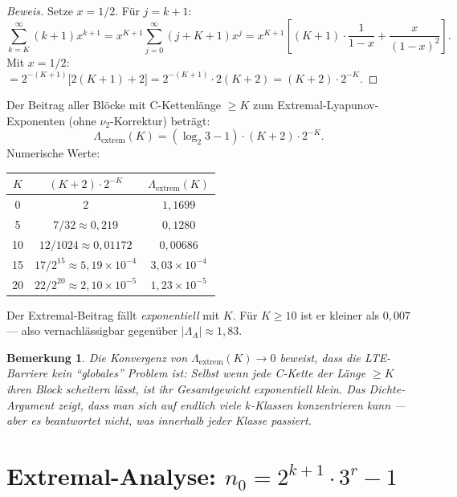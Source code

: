 \documentclass[12pt,a4paper]{article}
\newtheorem{bemerkung}[definition]{Bemerkung}
\newenvironment{beweis}{\begin{proof}[Beweis]}{\end{proof}}
\newcommand{\vii}{\nu_2}
\begin{document}
\begin{beweis}
Setze $x = 1/2$. Für $j = k+1$:
\[
  \sum_{k=K}^{\infty}(k+1)x^{k+1}
  = x^{K+1}\sum_{j=0}^{\infty}(j+K+1)x^j
  = x^{K+1}\!\left[(K+1)\cdot\frac{1}{1-x} + \frac{x}{(1-x)^2}\right].
\]
Mit $x=1/2$: $= 2^{-(K+1)}\bigl[2(K+1)+2\bigr] = 2^{-(K+1)}\cdot 2(K+2) = (K+2)\cdot 2^{-K}$.
\end{beweis}

\begin{tcolorbox}[ergebnis, title={Extremal-Beitrag ist vernachlässigbar}]
Der Beitrag aller Blöcke mit C-Kettenlänge $\geq K$ zum
Extremal-Lyapunov-Exponenten (ohne $\vii$-Korrektur) beträgt:
\[
  \Lambda_{\mathrm{extrem}}(K) =
  (\log_2 3 - 1)\cdot(K+2)\cdot 2^{-K}.
\]
Numerische Werte:
\begin{center}
\renewcommand{\arraystretch}{1.25}
\begin{tabular}{ccc}
\toprule
$K$ & $(K+2)\cdot 2^{-K}$ & $\Lambda_{\mathrm{extrem}}(K)$ \\
\midrule
0  & $2$         & $1{,}1699$ \\
5  & $7/32 \approx 0{,}219$ & $0{,}1280$ \\
10 & $12/1024 \approx 0{,}01172$ & $0{,}00686$ \\
15 & $17/2^{15} \approx 5{,}19\times10^{-4}$ & $3{,}03\times10^{-4}$ \\
20 & $22/2^{20} \approx 2{,}10\times10^{-5}$ & $1{,}23\times10^{-5}$ \\
\bottomrule
\end{tabular}
\end{center}
Der Extremal-Beitrag fällt \emph{exponentiell} mit $K$. Für $K \geq 10$
ist er kleiner als $0{,}007$ --- also vernachlässigbar gegenüber
$|\Lambda_A| \approx 1{,}83$.
\end{tcolorbox}

\begin{bemerkung}
Die Konvergenz von $\Lambda_{\mathrm{extrem}}(K) \to 0$ beweist,
dass die LTE-Barriere kein ``globales'' Problem ist: Selbst wenn
jede C-Kette der Länge $\geq K$ ihren Block scheitern lässt,
ist ihr Gesamtgewicht exponentiell klein. Das Dichte-Argument zeigt,
dass man sich auf endlich viele $k$-Klassen konzentrieren kann ---
aber es beantwortet nicht, was innerhalb jeder Klasse passiert.
\end{bemerkung}

\section{Extremal-Analyse: $n_0 = 2^{k+1}\cdot 3^r - 1$}
\label{sec:extremal}
\end{document}
